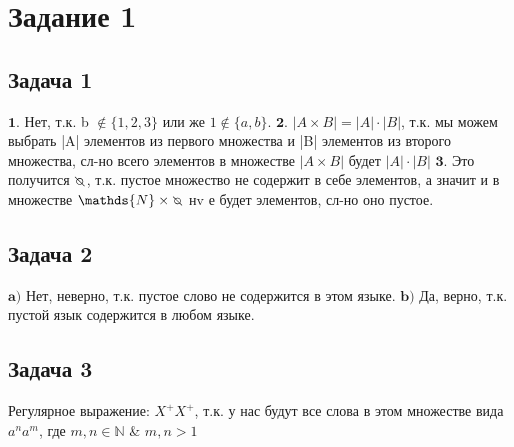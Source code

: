 \documentclass[a4paper,14pt]{article} %
\begin{document}

\section{Задание 1}
\subsection{Задача 1}

$\textbf{1.}$ Нет, т.к. b $\notin \{1, 2, 3\}$ или же $1 \notin \{a, b\}$.
\newline
$\textbf{2.}$ $|A \times B| = |A| \cdot |B|$, т.к. мы можем выбрать |A| элементов из первого множества 
и |B| элементов из второго множества, сл-но всего элементов в множестве $|A \times B|$ будет $|A| \cdot |B|$
\newline
$\textbf{3.}$ Это получится $\invdiameter$, т.к. пустое множество не содержит в себе элементов, а значит 
и в множестве $\mathds{N} \times \invdiameter$ нv е будет элементов, сл-но оно пустое.

\subsection{Задача 2}
$\textbf{a)}$ Нет, неверно, т.к. пустое слово не содержится в этом языке.
\newline
$\textbf{b)}$ Да, верно, т.к. пустой язык содержится в любом языке.

\subsection{Задача 3}
Регулярное выражение: $X^{+}X^{+}$, т.к. у нас будут все слова в этом множестве вида $a^{n}a^{m}$, где $m, n \in \mathds{N}$ \& $m, n>1$
\end{document}
